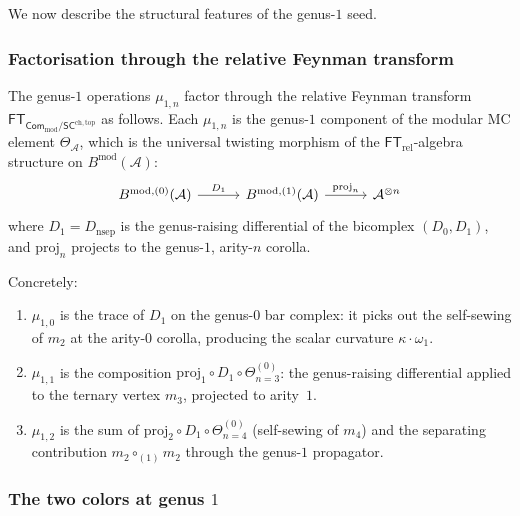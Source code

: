 \documentclass[11pt]{article}
\newcommand{\cA}{\mathcal{A}}
\newcommand{\Com}{\mathsf{Com}}
\newcommand{\SCchtop}{\mathsf{SC}^{\mathrm{ch,top}}}
\providecommand{\FT}{\mathsf{FT}}
\providecommand{\Bmod}{B^{\mathrm{mod}}}
\begin{document}
We now describe the structural features of the genus-$1$ seed.

\subsubsection{Factorisation through the relative Feynman transform}

\begin{proposition}
\label{prop:wn-mu1n-factorisation}
The genus-$1$ operations $\mu_{1,n}$ factor through the relative
Feynman transform $\FT_{\Com_{\mathrm{mod}}/\SCchtop}$ as follows.
Each $\mu_{1,n}$ is the genus-$1$ component of the modular
MC element $\Theta_\cA$, which is the universal twisting morphism
of the $\FT_{\mathrm{rel}}$-algebra structure on $\Bmod(\cA)$:
\[
\begin{tikzcd}[column sep=3em]
B^{\mathrm{mod},(0)}(\cA)
\ar[r, "D_1"]
&
B^{\mathrm{mod},(1)}(\cA)
\ar[r, "\mathrm{proj}_{n}"]
&
\cA^{\otimes n}
\end{tikzcd}
\]
where $D_1 = D_{\mathrm{nsep}}$ is the genus-raising differential
of the bicomplex $(D_0, D_1)$, and $\mathrm{proj}_n$ projects to
the genus-$1$, arity-$n$ corolla.
\end{proposition}

Concretely:
\begin{enumerate}[label=\textup{(\roman*)}]
\item $\mu_{1,0}$ is the trace of $D_1$ on the genus-$0$ bar
  complex: it picks out the self-sewing of $m_2$ at the arity-$0$
  corolla, producing the scalar curvature $\kappa \cdot \omega_1$.
\item $\mu_{1,1}$ is the composition $\mathrm{proj}_1 \circ D_1
  \circ \Theta^{(0)}_{n=3}$: the genus-raising differential applied
  to the ternary vertex $m_3$, projected to arity~$1$.
\item $\mu_{1,2}$ is the sum of $\mathrm{proj}_2 \circ D_1
  \circ \Theta^{(0)}_{n=4}$ (self-sewing of $m_4$) and the
  separating contribution $m_2 \circ_{(1)} m_2$ through the
  genus-$1$ propagator.
\end{enumerate}

\subsubsection{The two colors at genus $1$}
\end{document}
